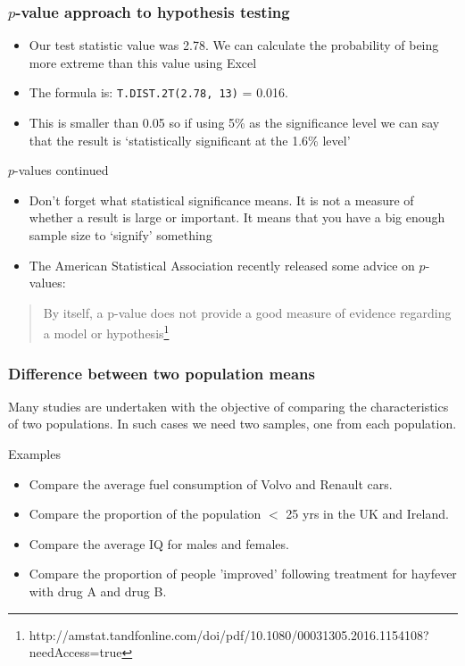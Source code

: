 \documentclass[12pt,xcolor=dvipsnames,handout,mathserif,aspectratio=169]{beamer}
\begin{document}
\begin{frame}
\frametitle{$p$-value approach to hypothesis testing}
\begin{itemize}
\item Our test statistic value was 2.78. We can calculate the probability of being more extreme than this value using Excel
\item The formula is: 	\texttt{T.DIST.2T(2.78, 13)} = 0.016.
\item This is smaller than 0.05 so if using 5\% as the significance level we can say that the result is `statistically significant at the 1.6\% level'
\end{itemize}
\end{frame}

\begin{frame}{$p$-values continued}
\begin{itemize}
\item Don't forget what statistical significance means. It is not a measure of whether a result is large or important. It means that you have a big enough sample size to `signify' something
\item The American Statistical Association recently released some advice on $p$-values:
\end{itemize}
\begin{quote}
By itself, a p-value does not provide a good measure of evidence regarding a model or hypothesis\footnote{http://amstat.tandfonline.com/doi/pdf/10.1080/00031305.2016.1154108?needAccess=true}
\end{quote}
\end{frame}

\begin{frame}
\frametitle{Difference between two population means}
Many studies are undertaken with the objective of comparing the characteristics of two populations. In such cases we need two samples, one from each population.

\begin{block}{Examples}
\begin{itemize}
\item Compare the average fuel consumption of Volvo and Renault cars.
\item Compare the proportion of the population $<$ 25 yrs in the UK and Ireland.
\item Compare the average IQ for males and females.
\item Compare the proportion of people 'improved' following treatment for hayfever with drug A and drug B.
\end{itemize}
\end{block}
\end{frame}
\end{document}

